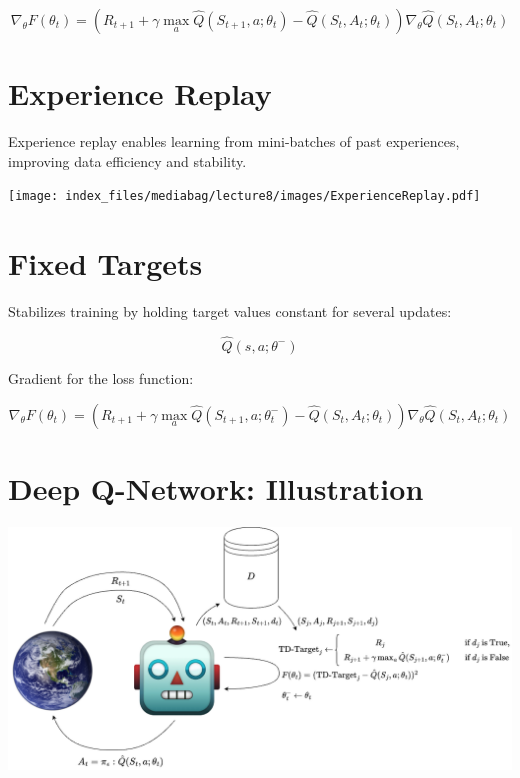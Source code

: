 \documentclass[
  letterpaper,
  DIV=11,
  numbers=noendperiod]{scrreprt}
\begin{document}
\[
\nabla_{\theta} F(\theta_{t}) = (R_{t+1} + \gamma \max_{a} \hat{Q}(S_{t+1},a; \theta_{t}) - \hat{Q}(S_{t},A_{t}; \theta_{t}))\nabla_{\theta} \hat{Q}(S_{t},A_{t}; \theta_{t})
\]

\section{Experience Replay}\label{experience-replay}

Experience replay enables learning from mini-batches of past
experiences, improving data efficiency and stability.

\begin{center}
\texttt{[image: index\_files/mediabag/lecture8/images/ExperienceReplay.pdf]}
\end{center}

\section{Fixed Targets}\label{fixed-targets}

Stabilizes training by holding target values constant for several
updates:

\[
\hat{Q}(s,a; \theta^{-})
\]

Gradient for the loss function:

\[
\nabla_\theta F(\theta_{t}) = (R_{t+1} + \gamma \max_{a} \hat{Q}(S_{t+1},a; \theta^{-}_{t}) - \hat{Q}(S_{t},A_{t}; \theta_{t}))\nabla_\theta \hat{Q}(S_{t},A_{t}; \theta_{t})
\]

\section{Deep Q-Network:
Illustration}\label{deep-q-network-illustration}

\begin{center}
\includegraphics[width=1\linewidth,height=\textheight,keepaspectratio]{lecture8/images/DQN.png}
\end{center}
\end{document}
